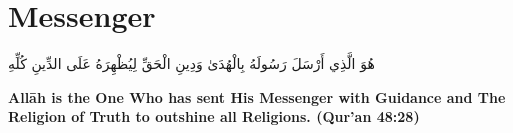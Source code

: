 \chapter{Messenger}
\begin{center}
    {\Huge    
        \begin{Arabic}
            هُوَ الَّذِي أَرْسَلَ رَسُولَهُ بِالْهُدَىٰ وَدِينِ الْحَقِّ لِيُظْهِرَهُ عَلَى الدِّينِ كُلِّهِ
        \end{Arabic}
    }
\end{center}
\vspace*{\fill}
\vspace{3cm}
\begin{center}
    \large \textbf{Allāh is the One Who has sent His Messenger with Guidance and The Religion of Truth to outshine all Religions. (Qur'an 48:28)}
\end{center}
